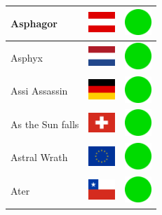 \documentclass[12pt, a4paper, twoside]{report}
\begin{document}
\begin{center}
\begin{longtable}{|p{5cm}|p{2cm}|p{2cm}|}
 Asphagor                                                   & \includegraphics[width=1cm]{../img/flags/at} &   \includegraphics[width=1cm]{../likes/y} \\ \hline
 Asphyx                                                     & \includegraphics[width=1cm]{../img/flags/nl} &   \includegraphics[width=1cm]{../likes/y} \\ \hline
 Assi Assassin                                              & \includegraphics[width=1cm]{../img/flags/de} &   \includegraphics[width=1cm]{../likes/y} \\ \hline
 As the Sun falls                                           & \includegraphics[width=1cm]{../img/flags/ch} &   \includegraphics[width=1cm]{../likes/y} \\ \hline
 Astral Wrath                                               & \includegraphics[width=1cm]{../img/flags/eu} &   \includegraphics[width=1cm]{../likes/y} \\ \hline
 Ater                                                       & \includegraphics[width=1cm]{../img/flags/cl} &   \includegraphics[width=1cm]{../likes/y} \\ \hline

\end{longtable}
\end{center}
\end{document}
